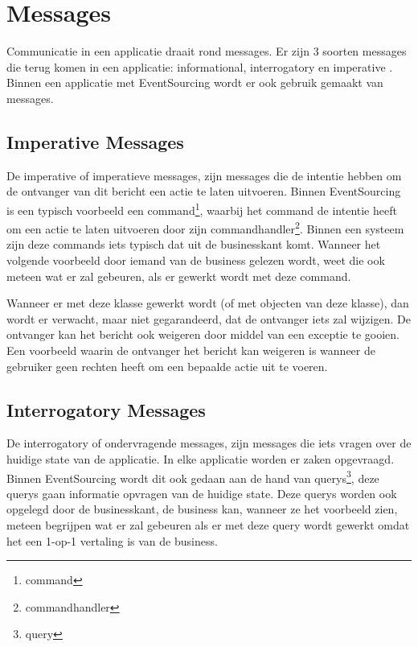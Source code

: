 
\section{Messages}
\label{sec:messages}

Communicatie in een applicatie draait rond messages. Er zijn 3 soorten messages die terug komen in een applicatie: informational, interrogatory en imperative \autocite{Verraes2015Messages}.
Binnen een applicatie met EventSourcing wordt er ook gebruik gemaakt van messages.

\subsection{Imperative Messages}
\label{subsec:imperative-messages}

De imperative of imperatieve messages, zijn messages die de intentie hebben om de ontvanger van dit bericht een actie te laten uitvoeren.
Binnen EventSourcing is een typisch voorbeeld een \Gls{command}\footnote{\glsdesc{command}}, waarbij het \Gls{command} de intentie heeft om een actie te laten uitvoeren door zijn \Gls{commandhandler}\footnote{\glsdesc{commandhandler}}. Binnen een systeem zijn deze \Glspl{command} iets typisch dat uit de businesskant komt. Wanneer het volgende voorbeeld door iemand van de business gelezen wordt, weet die ook meteen wat er zal gebeuren, als er gewerkt wordt met deze \Gls{command}.


Wanneer er met deze klasse gewerkt wordt (of met objecten van deze klasse), dan wordt er verwacht, maar niet gegarandeerd, dat de ontvanger iets zal wijzigen. De ontvanger kan het bericht ook weigeren door middel van een exceptie te gooien. Een voorbeeld waarin de ontvanger het bericht kan weigeren is wanneer de gebruiker geen rechten heeft om een bepaalde actie uit te voeren.

\subsection{Interrogatory Messages}
\label{subsec:interrogatory-messages}

De interrogatory of ondervragende messages, zijn messages die iets vragen over de huidige \gls{state} van de applicatie. In elke applicatie worden er zaken opgevraagd. Binnen EventSourcing wordt dit ook gedaan aan de hand van \Glspl{query}\footnote{\glsdesc{query}}, deze \Glspl{query} gaan informatie opvragen van de huidige \gls{state}. Deze \Glspl{query} worden ook opgelegd door de businesskant, de business kan, wanneer ze het voorbeeld zien, meteen begrijpen wat er zal gebeuren als er met deze \Gls{query} wordt gewerkt omdat het een 1-op-1 vertaling is van de business.


